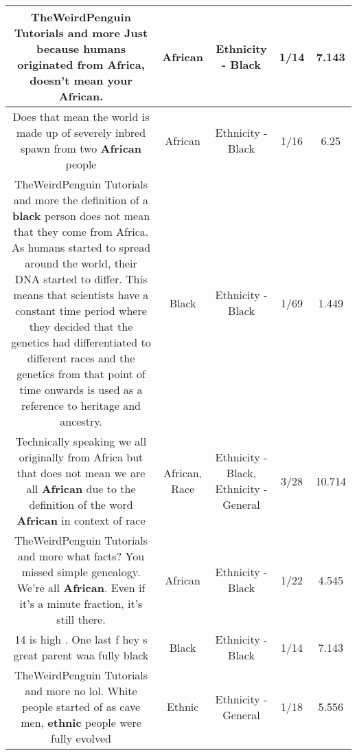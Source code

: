 \documentclass[11pt]{article}
\newlength\mylength
\begin{document}
\begin{center}
\begin{longtable}{|C{.65\mylength}|C{.30\mylength}|C{.12\mylength}|C{.12\mylength}|C{.12\mylength}|}
  \small TheWeirdPenguin Tutorials and more Just because humans originated from Africa, doesn't mean your \textbf{African}.\normalsize   & African & Ethnicity - Black & 1/14 & 7.143 \\  \hline
  \small Does that mean the world is made up of severely inbred spawn from two \textbf{African} people\normalsize   & African & Ethnicity - Black & 1/16 & 6.25 \\  \hline
  \small TheWeirdPenguin Tutorials and more the definition of a \textbf{black} person does not mean that they come from Africa. As humans started to spread around the world, their DNA started to differ. This means that scientists have a constant time period where they decided that the genetics had differentiated to different races and the genetics from that point of time onwards is used as a reference to heritage and ancestry.\normalsize   & Black & Ethnicity - Black & 1/69 & 1.449 \\  \hline
  \small Technically speaking we all originally from Africa but that does not mean we are all \textbf{African} due to the definition of the word \textbf{African} in context of race\normalsize   & African, Race & Ethnicity - Black, Ethnicity - General & 3/28 & 10.714 \\  \hline
  \small TheWeirdPenguin Tutorials and more what facts? You missed simple genealogy. We're all \textbf{African}. Even if it's a minute fraction, it's still there.\normalsize   & African & Ethnicity - Black & 1/22 & 4.545 \\  \hline
  \small 14 is high . One last f hey s great parent waa fully black\normalsize   & Black & Ethnicity - Black & 1/14 & 7.143 \\  \hline
  \small TheWeirdPenguin Tutorials and more no lol.  White people started of as cave men, \textbf{ethnic} people were fully evolved\normalsize   & Ethnic & Ethnicity - General & 1/18 & 5.556 \\  \hline

\end{longtable}
\end{center}
\end{document}
